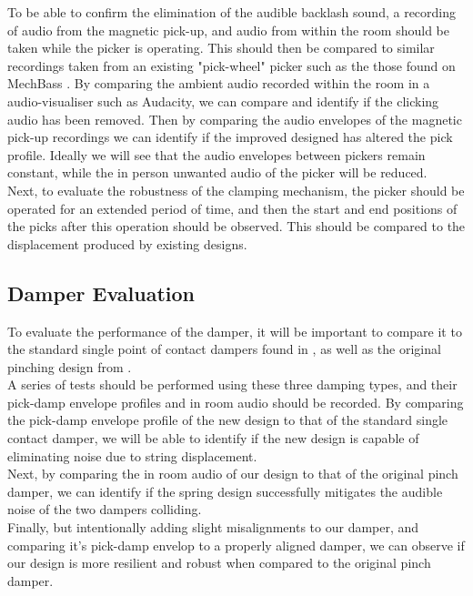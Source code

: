 \documentclass[a4paper,11pt]{article}
\begin{document}
To be able to confirm the elimination of the audible backlash sound, a recording of audio from the magnetic pick-up, and audio from within the room should be taken while the picker is operating. This should then be compared to similar recordings taken from an existing "pick-wheel" picker such as the those found on MechBass \cite{McVay2015}. By comparing the ambient audio recorded within the room in a audio-visualiser such as Audacity, we can compare and identify if the clicking audio has been removed. Then by comparing the audio envelopes of the magnetic pick-up recordings we can identify if the improved designed has altered the pick profile. Ideally we will see that the audio envelopes between pickers remain constant, while the in person unwanted audio of the picker will be reduced.\\

Next, to evaluate the robustness of the clamping mechanism, the picker should be operated for an extended period of time, and then the start and end positions of the picks after this operation should be observed. This should be compared to the displacement produced by existing designs.

\subsection{Damper Evaluation}

To evaluate the performance of the damper, it will be important to compare it to the standard single point of contact dampers found in \cite{Carnegie2017}, as well as the original pinching design from \cite{kapur_history_nodate}.\\

A series of tests should be performed using these three damping types, and their pick-damp envelope profiles and in room audio should be recorded. By comparing the pick-damp envelope profile of the new design to that of the standard single contact damper, we will be able to identify if the new design is capable of eliminating noise due to string displacement.\\

Next, by comparing the in room audio of our design to that of the original pinch damper, we can identify if the spring design successfully mitigates the audible noise of the two dampers colliding.\\

Finally, but intentionally adding slight misalignments to our damper, and comparing it's pick-damp envelop to a properly aligned damper, we can observe if our design is more resilient and robust when compared to the original pinch damper.
\end{document}

